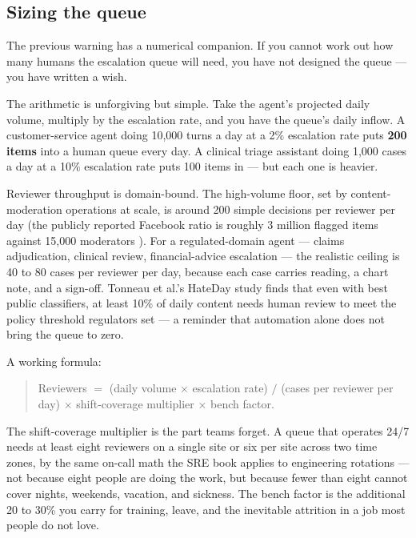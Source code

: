 \subsection*{Sizing the queue}

The previous warning has a numerical companion. If you cannot work out how many humans the escalation queue will need, you have not designed the queue --- you have written a wish.

The arithmetic is unforgiving but simple. Take the agent's projected daily volume, multiply by the escalation rate, and you have the queue's daily inflow. A customer-service agent doing 10{,}000 turns a day at a 2\% escalation rate puts \textbf{200 items} into a human queue every day. A clinical triage assistant doing 1{,}000 cases a day at a 10\% escalation rate puts 100 items in --- but each one is heavier.

Reviewer throughput is domain-bound. The high-volume floor, set by content-moderation operations at scale, is around 200 simple decisions per reviewer per day (the publicly reported Facebook ratio is roughly 3 million flagged items against 15{,}000 moderators \citep{mit-tr-fb-moderators-2020}). For a regulated-domain agent --- claims adjudication, clinical review, financial-advice escalation --- the realistic ceiling is 40 to 80 cases per reviewer per day, because each case carries reading, a chart note, and a sign-off. Tonneau et al.'s HateDay study \citep{tonneau-hateday-2024} finds that even with best public classifiers, at least 10\% of daily content needs human review to meet the policy threshold regulators set --- a reminder that automation alone does not bring the queue to zero.

A working formula:

\begin{quote}
Reviewers $=$ (daily volume $\times$ escalation rate) $/$ (cases per reviewer per day) $\times$ shift-coverage multiplier $\times$ bench factor.
\end{quote}

The shift-coverage multiplier is the part teams forget. A queue that operates 24/7 needs at least eight reviewers on a single site or six per site across two time zones, by the same on-call math the SRE book applies to engineering rotations \citep{google-sre-book} --- not because eight people are doing the work, but because fewer than eight cannot cover nights, weekends, vacation, and sickness. The bench factor is the additional 20 to 30\% you carry for training, leave, and the inevitable attrition in a job most people do not love.


